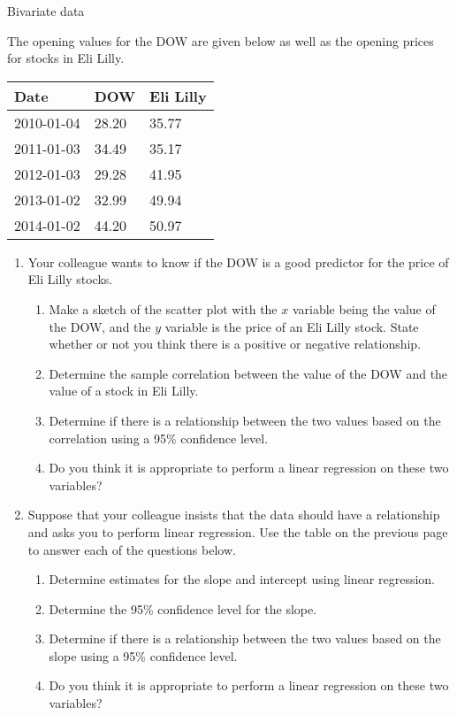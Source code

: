 \documentclass[12pt]{article}
\begin{document}
Bivariate data

The opening values for the DOW are given below as well as the opening
prices for stocks in Eli Lilly.

\begin{tabular}{l|l|l}
  Date & DOW & Eli Lilly \\ \hline
  2010-01-04 & 28.20 & 35.77 \\
  2011-01-03 & 34.49 & 35.17 \\
  2012-01-03 & 29.28 & 41.95 \\
  2013-01-02 & 32.99 & 49.94 \\
  2014-01-02 & 44.20 & 50.97
\end{tabular}

\begin{enumerate}
\item Your colleague wants to know if the DOW is a good predictor for
  the price of Eli Lilly stocks.

  \begin{enumerate}
  \item Make a sketch of the scatter plot with the $x$ variable being
    the value of the DOW, and the $y$ variable is the price of an Eli
    Lilly stock. State whether or not you think there is a positive or
    negative relationship.
    \vfill
  \item Determine the sample correlation between the value of the DOW
    and the value of a stock in Eli Lilly. 
    \vfill
  \item Determine if there is a relationship between the two values
    based on the correlation using a 95\% confidence level.
    \vfill
  \item Do you think it is appropriate to perform a linear regression
    on these two variables?
  \end{enumerate}

\clearpage

\item Suppose that your colleague insists that the data should have a
  relationship and asks you to perform linear regression. Use the
  table on the previous page to answer each of the questions below.

  \begin{enumerate}
  \item Determine estimates for the slope and intercept using linear
    regression. 
    \vfill
  \item Determine the 95\% confidence level for the slope.
    \vfill
  \item Determine if there is a relationship between the two values
    based on the slope using a 95\% confidence level.
    \vfill
  \item Do you think it is appropriate to perform a linear regression
    on these two variables?
  \end{enumerate}


\end{enumerate}
\end{document}
